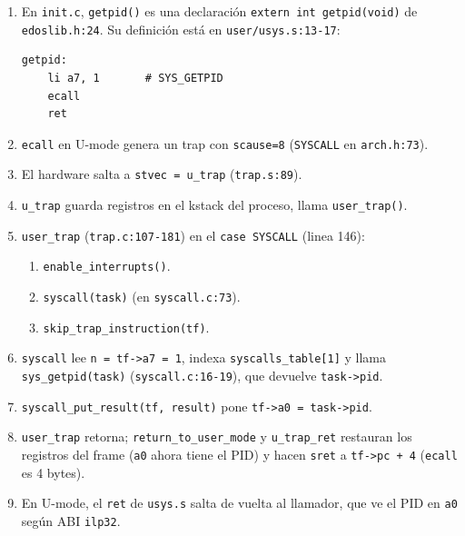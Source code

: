\documentclass[11pt,a4paper]{article}
\begin{document}
\begin{respuesta}
\begin{enumerate}[leftmargin=*]
    \item En \texttt{init.c}, \texttt{getpid()} es una declaración
        \texttt{extern int getpid(void)} de \texttt{edoslib.h:24}.
        Su definición está en \texttt{user/usys.s:13-17}:
\begin{lstlisting}[style=asmstyle]
getpid:
    li a7, 1       # SYS_GETPID
    ecall
    ret
\end{lstlisting}
    \item \texttt{ecall} en U-mode genera un trap con
        \texttt{scause=8} (\texttt{SYSCALL} en \texttt{arch.h:73}).
    \item El hardware salta a \texttt{stvec = u\_trap}
        (\texttt{trap.s:89}).
    \item \texttt{u\_trap} guarda registros en el kstack del
        proceso, llama \texttt{user\_trap()}.
    \item \texttt{user\_trap} (\texttt{trap.c:107-181}) en el
        \texttt{case SYSCALL} (linea 146):
        \begin{enumerate}[nosep,label=\alph*)]
            \item \texttt{enable\_interrupts()}.
            \item \texttt{syscall(task)} (en \texttt{syscall.c:73}).
            \item \texttt{skip\_trap\_instruction(tf)}.
        \end{enumerate}
    \item \texttt{syscall} lee \texttt{n = tf->a7 = 1}, indexa
        \texttt{syscalls\_table[1]} y llama \texttt{sys\_getpid(task)}
        (\texttt{syscall.c:16-19}), que devuelve \texttt{task->pid}.
    \item \texttt{syscall\_put\_result(tf, result)} pone
        \texttt{tf->a0 = task->pid}.
    \item \texttt{user\_trap} retorna; \texttt{return\_to\_user\_mode}
        y \texttt{u\_trap\_ret} restauran los registros del frame
        (\texttt{a0} ahora tiene el PID) y hacen \texttt{sret} a
        \texttt{tf->pc + 4} (\texttt{ecall} es 4 bytes).
    \item En U-mode, el \texttt{ret} de \texttt{usys.s} salta de
        vuelta al llamador, que ve el PID en \texttt{a0} según ABI
        \texttt{ilp32}.
\end{enumerate}
\end{respuesta}
\end{document}
